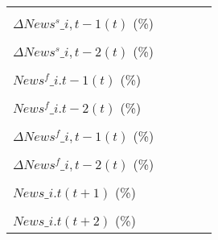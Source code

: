 {\begin{tabular}{l*{4}{c}}
                    &                     &                     &                     &                     \\
\addlinespace
$ \Delta News^s\_{i,t-1}(t)$ (\%)&                     &                     &                     &                     \\
                    &                     &                     &                     &                     \\
\addlinespace
$ \Delta News^s\_{i,t-2}(t)$ (\%)&                     &                     &                     &                     \\
                    &                     &                     &                     &                     \\
\addlinespace
$ News^f\_{i.t-1}(t)$ (\%)&                     &                     &                     &                     \\
                    &                     &                     &                     &                     \\
\addlinespace
$ News^f\_{i.t-2}(t)$ (\%)&                     &                     &                     &                     \\
                    &                     &                     &                     &                     \\
\addlinespace
$ \Delta News^f\_{i,t-1}(t)$ (\%)&                     &                     &                     &                     \\
                    &                     &                     &                     &                     \\
\addlinespace
$ \Delta News^f\_{i,t-2}(t)$ (\%)&                     &                     &                     &                     \\
                    &                     &                     &                     &                     \\
\addlinespace
$ News\_{i.t}(t+1)$ (\%)&                     &                     &                     &                     \\
                    &                     &                     &                     &                     \\
\addlinespace
$ News\_{i.t}(t+2)$ (\%)&                     &                     &                     &                     \\

\end{tabular}}
